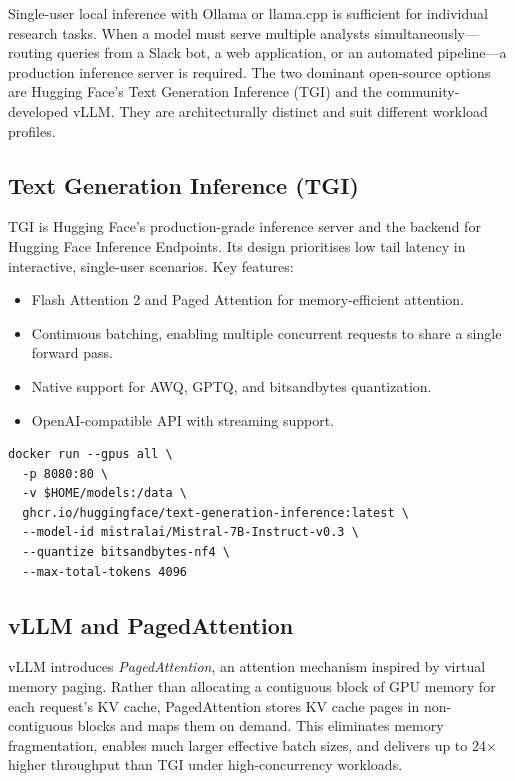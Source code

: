 \begin{context}
Single-user local inference with Ollama or llama.cpp is sufficient for
individual research tasks.  When a model must serve multiple analysts
simultaneously---routing queries from a Slack bot, a web application, or an
automated pipeline---a production inference server is required.  The two
dominant open-source options are Hugging Face's Text Generation Inference
(TGI) and the community-developed vLLM.  They are architecturally distinct
and suit different workload profiles.
\end{context}

\subsection{Text Generation Inference (TGI)}
\label{app:hf:tgi}

TGI is Hugging Face's production-grade inference server and the backend for
Hugging Face Inference Endpoints.  Its design prioritises low tail latency in
interactive, single-user scenarios.  Key features:

\begin{itemize}
  \item Flash Attention 2 and Paged Attention for memory-efficient attention.
  \item Continuous batching, enabling multiple concurrent requests to share a
        single forward pass.
  \item Native support for AWQ, GPTQ, and bitsandbytes quantization.
  \item OpenAI-compatible API with streaming support.
\end{itemize}

\begin{verbatim}
docker run --gpus all \
  -p 8080:80 \
  -v $HOME/models:/data \
  ghcr.io/huggingface/text-generation-inference:latest \
  --model-id mistralai/Mistral-7B-Instruct-v0.3 \
  --quantize bitsandbytes-nf4 \
  --max-total-tokens 4096
\end{verbatim}

\subsection{vLLM and PagedAttention}
\label{app:hf:vllm}

vLLM \citep{kwon2023vllm} introduces \emph{PagedAttention}, an attention
mechanism inspired by virtual memory paging.  Rather than allocating a
contiguous block of GPU memory for each request's KV cache, PagedAttention
stores KV cache pages in non-contiguous blocks and maps them on demand.
This eliminates memory fragmentation, enables much larger effective batch
sizes, and delivers up to 24$\times$ higher throughput than TGI under
high-concurrency workloads.


